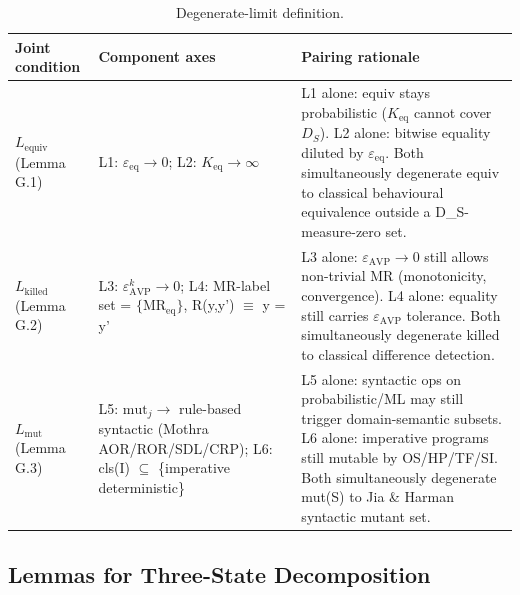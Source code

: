 \documentclass[manuscript,screen,review]{acmart}
\begin{document}
{%
\begin{longtable}[]{@{}
  >{\raggedright\arraybackslash}p{}
  >{\raggedright\arraybackslash}p{}
  >{\raggedright\arraybackslash}p{}@{}}
\caption{Degenerate-limit definition.}\label{tab:p2-29}\\
\toprule\noalign{}
\begin{minipage}[b]{\linewidth}\raggedright
Joint condition
\end{minipage} & \begin{minipage}[b]{\linewidth}\raggedright
Component axes
\end{minipage} & \begin{minipage}[b]{\linewidth}\raggedright
Pairing rationale
\end{minipage} \\
\midrule\noalign{}
\endfirsthead
\endhead
\bottomrule\noalign{}
\endlastfoot
\textbf{$L_{\mathrm{equiv}}$} (Lemma G.1) & L1: $\varepsilon_{\mathrm{eq}} \to 0$; L2: $K_{\mathrm{eq}} \to \infty$ & L1 alone:
equiv stays probabilistic ($K_{\mathrm{eq}}$ cannot cover $D_S$). L2 alone: bitwise
equality diluted by $\varepsilon_{\mathrm{eq}}$. Both simultaneously degenerate equiv to
classical behavioural equivalence outside a D\_S-measure-zero set. \\
\textbf{$L_{\mathrm{killed}}$} (Lemma G.2) & L3: $\varepsilon_{\mathrm{AVP}}^k \to 0$; L4: MR-label set =
$\{\mathrm{MR}_{\mathrm{eq}}\}$, R(y,y') $\equiv$ y = y' & L3 alone: $\varepsilon_{\mathrm{AVP}} \to 0$ still allows
non-trivial MR (monotonicity, convergence). L4 alone: equality still
carries $\varepsilon_{\mathrm{AVP}}$ tolerance. Both simultaneously degenerate killed to
classical difference detection. \\
\textbf{$L_{\mathrm{mut}}$} (Lemma G.3) & L5: $\mathrm{mut}_j \to$ rule-based syntactic (Mothra
AOR/ROR/SDL/CRP); L6: cls(I) $\subseteq$ \{imperative deterministic\} & L5 alone:
syntactic ops on probabilistic/ML may still trigger domain-semantic
subsets. L6 alone: imperative programs still mutable by OS/HP/TF/SI.
Both simultaneously degenerate mut(S) to Jia \& Harman syntactic mutant
set. \\
\end{longtable}
}

\subsection{Lemmas for Three-State Decomposition}\label{g.3-lemmas-three-state-decomposition-degenerates-under-l}
\end{document}
